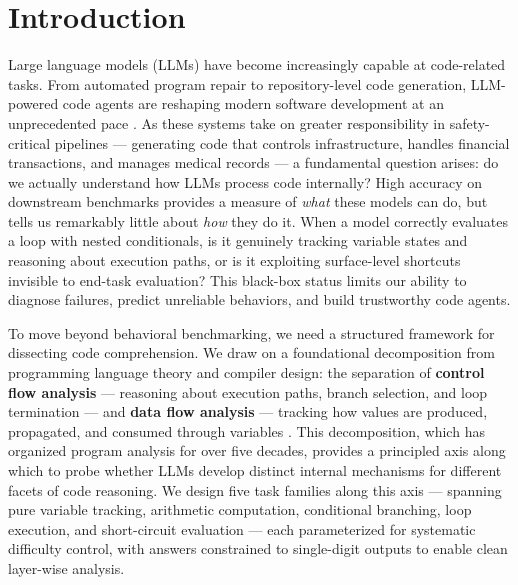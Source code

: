 \section{Introduction}
\label{sec:introduction}

Large language models (LLMs) have become increasingly capable at code-related tasks. From automated program repair to repository-level code generation, LLM-powered code agents are reshaping modern software development at an unprecedented pace \citep{yang2024swe, jimenez2024swebench}. As these systems take on greater responsibility in safety-critical pipelines --- generating code that controls infrastructure, handles financial transactions, and manages medical records --- a fundamental question arises: do we actually understand how LLMs process code internally? High accuracy on downstream benchmarks provides a measure of \textit{what} these models can do, but tells us remarkably little about \textit{how} they do it. When a model correctly evaluates a loop with nested conditionals, is it genuinely tracking variable states and reasoning about execution paths, or is it exploiting surface-level shortcuts invisible to end-task evaluation? This black-box status limits our ability to diagnose failures, predict unreliable behaviors, and build trustworthy code agents.

To move beyond behavioral benchmarking, we need a structured framework for dissecting code comprehension. We draw on a foundational decomposition from programming language theory and compiler design: the separation of \textbf{control flow analysis} --- reasoning about execution paths, branch selection, and loop termination --- and \textbf{data flow analysis} --- tracking how values are produced, propagated, and consumed through variables \citep{aho2006compilers, allen1970control, kildall1973unified, nielson1999principles}. This decomposition, which has organized program analysis for over five decades, provides a principled axis along which to probe whether LLMs develop distinct internal mechanisms for different facets of code reasoning. We design five task families along this axis --- spanning pure variable tracking, arithmetic computation, conditional branching, loop execution, and short-circuit evaluation --- each parameterized for systematic difficulty control, with answers constrained to single-digit outputs to enable clean layer-wise analysis.

